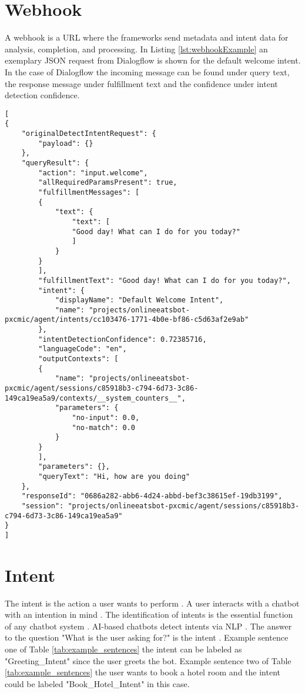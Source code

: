 \documentclass[12pt, backref]{report}
\begin{document}
\section{Webhook}
A webhook is a URL where the frameworks send metadata and intent data for analysis, completion, and processing.
In Listing \ref{lst:webhookExample} an exemplary JSON request from Dialogflow is shown for the default welcome intent.
In the case of Dialogflow the incoming message can be found under query text, the response message under fulfillment text and the confidence under intent detection confidence. 
\begin{lstlisting}[caption={Dialogflow Webhook Request Example}, label={lst:webhookExample},captionpos=b,frame=single,language={[Sharp]C},commentstyle=\color{mygreen},keywordstyle=\color{blue},
morekeywords={}]         	    
[
{
	"originalDetectIntentRequest": {
		"payload": {}
	},
	"queryResult": {
		"action": "input.welcome",
		"allRequiredParamsPresent": true,
		"fulfillmentMessages": [
		{
			"text": {
				"text": [
				"Good day! What can I do for you today?"
				]
			}
		}
		],
		"fulfillmentText": "Good day! What can I do for you today?",
		"intent": {
			"displayName": "Default Welcome Intent",
			"name": "projects/onlineeatsbot-pxcmic/agent/intents/cc103476-1771-4b0e-bf86-c5d63af2e9ab"
		},
		"intentDetectionConfidence": 0.72385716,
		"languageCode": "en",
		"outputContexts": [
		{
			"name": "projects/onlineeatsbot-pxcmic/agent/sessions/c85918b3-c794-6d73-3c86-149ca19ea5a9/contexts/__system_counters__",
			"parameters": {
				"no-input": 0.0,
				"no-match": 0.0
			}
		}
		],
		"parameters": {},
		"queryText": "Hi, how are you doing"
	},
	"responseId": "0686a282-abb6-4d24-abbd-bef3c38615ef-19db3199",
	"session": "projects/onlineeatsbot-pxcmic/agent/sessions/c85918b3-c794-6d73-3c86-149ca19ea5a9"
}
]\end{lstlisting}  

\section{Intent}
The intent is the action a user wants to perform \cite{dutta2017developing, rahman2017programming}.
A user interacts with a chatbot with an intention in mind \cite{buiildChatbotsPython, singhbuilding}.
The identification of intents is the essential function of any chatbot system \cite{singhbuilding}.
AI-based chatbots detect intents via NLP \cite{singhbuilding}. 
The answer to the question "What is the user asking for?" is the intent \cite{buiildChatbotsPython}.
Example sentence one of Table \ref{tab:example_sentences} the intent can be labeled as "Greeting\_Intent" since the user greets the bot.
Example sentence two of Table \ref{tab:example_sentences} the user wants to book a hotel room and the intent could be labeled "Book\_Hotel\_Intent" in this case.
\end{document}
